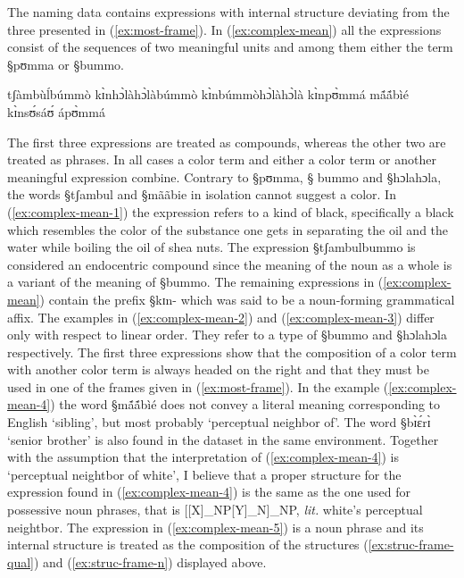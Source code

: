 The naming data contains expressions with internal structure deviating from the
three presented in (\ref{ex:most-frame}). In (\ref{ex:complex-mean}) all the
expressions consist of the sequences of two meaningful units and among them
either the term {\S pʊmma} or {\S bummo}. 


\begin{exe}
\ex\label{ex:complex-mean}
\begin{xlist}
  \ex\label{ex:complex-mean-1} tʃàmbùĺbúmmò
\ex\label{ex:complex-mean-2}  kɪ̀nhɔ̀làhɔ̀làbúmmò
\ex\label{ex:complex-mean-3}   kɪ̀nbúmmòhɔ̀làhɔ̀là
\ex\label{ex:complex-mean-4}  kɪ̀npʊ̀mmá mã́ã́bìé
\ex\label{ex:complex-mean-5}  kɪ̀nsʊ́sáʊ́ ápʊ̀mmá
\end{xlist}
\end{exe}


The first three expressions are treated as compounds, whereas the other two are
treated as phrases. In all cases  a  color term and either a color
term or another meaningful expression combine. Contrary to {\S pʊmma}, {\S
bummo} and {\S hɔlahɔla}, the words  {\S tʃambul} and {\S mããbie} in isolation
cannot suggest a color. In (\ref{ex:complex-mean-1}) the expression refers to
a kind of black, specifically a black which resembles the color of the substance
one
gets in separating the oil and the water while boiling the oil of shea nuts. The
expression
{\S tʃambulbummo} is considered an endocentric compound since the meaning of the
 noun as a whole is a variant of the meaning of {\S bummo}.  The remaining
 expressions in (\ref{ex:complex-mean}) contain the prefix {\S kɪn-} which was
said to be a noun-forming grammatical affix. The examples in
(\ref{ex:complex-mean-2}) and (\ref{ex:complex-mean-3})  differ only  with
respect
to linear order. They refer to a type of  {\S bummo} and {\S hɔlahɔla} 
respectively. The first three expressions show that the composition of
a color term with another color term is always headed on the right and that they
must be used in one of the frames given in (\ref{ex:most-frame}).  In the
example (\ref{ex:complex-mean-4}) the word {\S mã́ã́bìé} does not convey
a literal meaning corresponding to English `sibling', but
most probably `perceptual neighbor of'. The word {\S bɪ̀ɛ́rɪ̀} `senior
brother' is also found in the dataset in the same environment. Together with the
assumption
that the  interpretation of (\ref{ex:complex-mean-4}) is `perceptual
neightbor of white', I believe
that a proper structure for the expression found in (\ref{ex:complex-mean-4}) is
the same as the one used for possessive noun phrases, that is
[[X]_{NP}[Y]_{N}]_{NP}, {\it lit.} white's perceptual neightbor.  The
expression in
(\ref{ex:complex-mean-5}) is  a noun phrase and its internal
structure is treated as the composition of the  structures
(\ref{ex:struc-frame-qual}) and  (\ref{ex:struc-frame-n})  displayed above.


